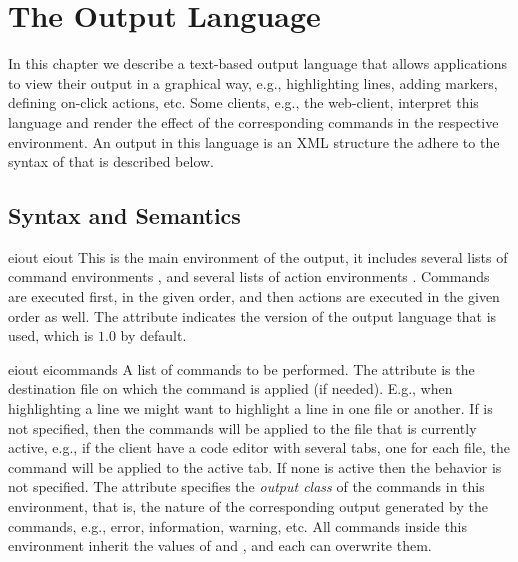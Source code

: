 {%
}

\chapter{The \ei Output Language}
\label{ch:eiol}

In this chapter we describe a text-based output language that allows
applications to view their output in a graphical way, e.g.,
highlighting lines, adding markers, defining on-click actions, etc.
%
Some clients, e.g., the web-client, interpret this language and render
the effect of the corresponding commands in the respective
environment. An output in this language is an XML structure the adhere
to the syntax of  that is described below.


\section{Syntax and Semantics}
\bigskip
\xmlstruct
{eiout}
{eiout} 
{%
%
  This is the main environment of the output, it includes several
  lists of command environments , and
  several lists of action environments .
%
  Commands are executed first, in the given order, and then actions are
  executed in the given order as well.
%
  The  attribute indicates the version of the
  output language that is used, which is $1.0$ by default.
%
}


\bigskip
\xmlstruct
{eiout}
{eicommands}
{%
%
A list of commands to be performed.
%
The attribute  is the destination file on which
the command is applied (if needed).
%
E.g., when highlighting a line we might want to highlight a line in
one file or another. 
%
If  is not specified, then the commands will be
applied to the file that is currently active, e.g., if the client have
a code editor with several tabs, one for each file, the command will
be applied to the active tab. If none is active then the behavior is
not specified.
% 
The attribute  specifies the \emph{output
  class} of the commands in this environment, that is, the nature of
the corresponding output generated by the commands, e.g., error,
information, warning, etc.
%
All commands inside this environment inherit the values of
 and , and each can
overwrite them.
%
}


